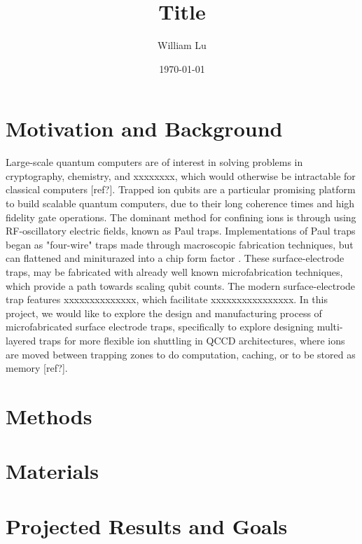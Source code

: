 \documentclass[reprint, amsmath, amssymb, aps, pra]{revtex4-2}
\begin{document}
\title{Title}

\author{William Lu}
\date{\today}

\begin{abstract}

\end{abstract}

\maketitle

\section{Motivation and Background}

Large-scale quantum computers are of interest in solving problems in cryptography, chemistry, and xxxxxxxx, which would otherwise be intractable for classical computers [ref?]. Trapped ion qubits are a particular promising platform to build scalable quantum computers, due to their long coherence times and high fidelity gate operations.\cite{Bruzewicz_2019} The dominant method for confining ions is through using RF-oscillatory electric fields, known as Paul traps. Implementations of Paul traps began as "four-wire" traps made through macroscopic fabrication techniques, but can flattened and miniturazed into a chip form factor \cite{chiaverini2005surfaceelectrodearchitectureiontrapquantum}. These surface-electrode traps, may be fabricated with already well known microfabrication techniques, which provide a path towards scaling qubit counts. The modern surface-electrode trap features xxxxxxxxxxxxxx, which facilitate xxxxxxxxxxxxxxxx. In this project, we would like to explore the design and manufacturing process of microfabricated surface electrode traps, specifically to explore designing multi-layered traps for more flexible ion shuttling in QCCD architectures, where ions are moved between trapping zones to do computation, caching, or to be stored as memory [ref?].

\section{Methods}

\section{Materials}

\section{Projected Results and Goals}


\end{document}
